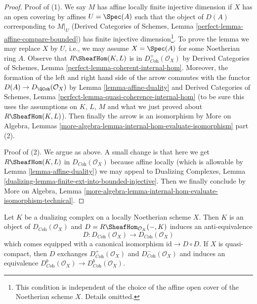 \begin{proof}
Proof of (1). We say $M$ has affine locally finite injective dimension
if $X$ has an open covering by affines $U = \Spec(A)$ such that the object
of $D(A)$ corresponding to $M|_U$ (Derived Categories of Schemes, Lemma
\ref{perfect-lemma-affine-compare-bounded})
has finite injective dimension\footnote{This condition is independent of the
choice of the affine open cover of the Noetherian scheme $X$.
Details omitted.}. To prove the lemma we may
replace $X$ by $U$, i.e., we may assume $X = \Spec(A)$
for some Noetherian ring $A$. Observe that
$R\SheafHom(K, L)$ is in $D^+_{\textit{Coh}}(\mathcal{O}_X)$ by
Derived Categories of Schemes, Lemma
\ref{perfect-lemma-coherent-internal-hom}.
Moreover, the formation of the left and right hand side
of the arrow commutes with the functor $D(A) \to D_\QCoh(\mathcal{O}_X)$ by
Lemma \ref{lemma-affine-duality} and
Derived Categories of Schemes, Lemma
\ref{perfect-lemma-quasi-coherence-internal-hom}
(to be sure this uses the assumptions on $K$, $L$, $M$ and what we just
proved about $R\SheafHom(K, L)$).
Then finally the arrow is an isomorphism by
More on Algebra, Lemmas
\ref{more-algebra-lemma-internal-hom-evaluate-isomorphism} part (2).

\medskip\noindent
Proof of (2). We argue as above. A small change is that here we get
$R\SheafHom(K, L)$ in $D_{\textit{Coh}}(\mathcal{O}_X)$ because
affine locally (which is allowable by Lemma \ref{lemma-affine-duality})
we may appeal to Dualizing Complexes, Lemma
\ref{dualizing-lemma-finite-ext-into-bounded-injective}.
Then we finally conclude by
More on Algebra, Lemma
\ref{more-algebra-lemma-internal-hom-evaluate-isomorphism-technical}.
\end{proof}

\begin{lemma}
\label{lemma-dualizing-schemes}
Let $K$ be a dualizing complex on a locally Noetherian scheme $X$.
Then $K$ is an object of $D_{\textit{Coh}}(\mathcal{O}_X)$
and $D = R\SheafHom_{\mathcal{O}_X}(-, K)$ induces an anti-equivalence
$$
D :
D_{\textit{Coh}}(\mathcal{O}_X)
\longrightarrow
D_{\textit{Coh}}(\mathcal{O}_X)
$$
which comes equipped with a canonical isomorphism
$\text{id} \to D \circ D$. If $X$ is quasi-compact, then
$D$ exchanges $D^+_{\textit{Coh}}(\mathcal{O}_X)$ and
$D^-_{\textit{Coh}}(\mathcal{O}_X)$ and induces an equivalence
$D^b_{\textit{Coh}}(\mathcal{O}_X) \to D^b_{\textit{Coh}}(\mathcal{O}_X)$.
\end{lemma}

